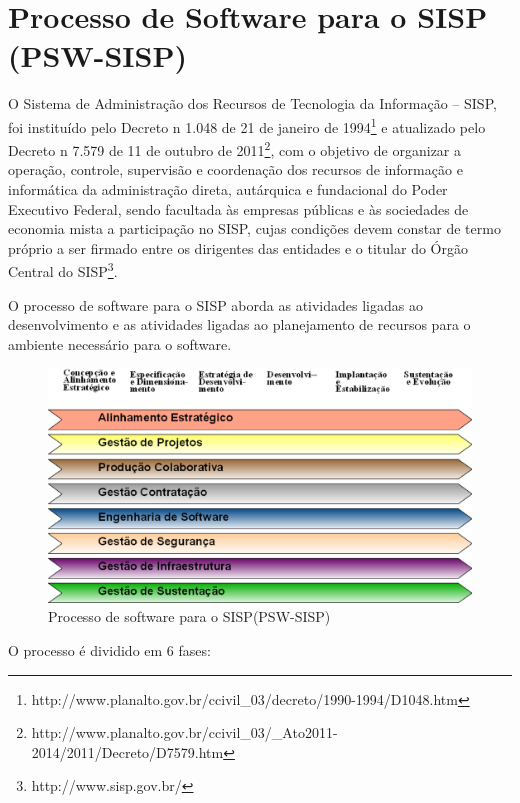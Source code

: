 \section{Processo de Software para o SISP (PSW-SISP)}

O Sistema de Administração dos Recursos de Tecnologia da Informação – SISP, 
foi instituído pelo Decreto n 1.048 de 21 de janeiro de 1994\footnote{http://www.planalto.gov.br/ccivil\_03/decreto/1990-1994/D1048.htm}
e atualizado pelo Decreto n 7.579 de 11 de outubro de 2011\footnote{http://www.planalto.gov.br/ccivil\_03/\_Ato2011-2014/2011/Decreto/D7579.htm}, 
com o objetivo de organizar a operação, 
controle, supervisão e coordenação dos recursos de informação e informática da 
administração direta, autárquica e fundacional do Poder Executivo Federal, sendo 
facultada às empresas públicas e às sociedades de economia mista a participação no SISP, 
cujas condições devem constar de termo próprio a ser firmado entre os dirigentes das 
entidades e o titular do Órgão Central do SISP\footnote{http://www.sisp.gov.br/}.

O processo de software para o SISP aborda as atividades ligadas ao desenvolvimento 
e as atividades ligadas ao planejamento de recursos para o ambiente necessário para
o software.
\newpage
\begin{figure}[htpb]
 \begin{center}
    \includegraphics[width=.90\textwidth]{figuras/EstruturaPSW.eps}
 \end{center}
  \caption{Processo de software para o SISP(PSW-SISP)}
  \label{fig:core_concurrent}
\end{figure}

O processo é dividido em 6 fases:

